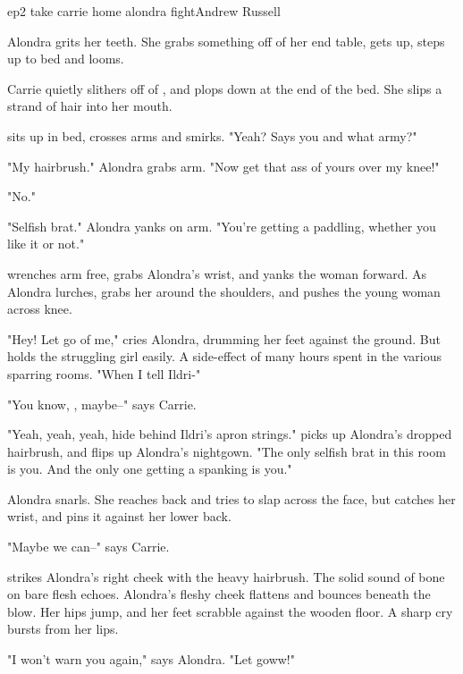 \documentclass{book}
\begin{document}
\begin{childnode}{ep2 take carrie home alondra fight}{Andrew Russell}

    Alondra grits her teeth. She grabs something off of her end table, gets up, steps up to \names{} bed and looms. 
    
    Carrie quietly slithers off of \name{}, and plops down at the end of the bed. She slips a strand of hair into her mouth.

    \name{} sits up in bed, crosses \hisher{} arms and smirks. "Yeah? Says you and what army?"

    "My hairbrush." Alondra grabs \names{} arm. "Now get that  ass of yours over my knee!"

    "No."

    "Selfish brat." Alondra yanks on \names{} arm. "You're getting a paddling, whether you like it or not."

    \name{} wrenches \hisher{} arm free, grabs Alondra's wrist, and yanks the woman forward. As Alondra lurches, \name{} grabs her around the shoulders, and pushes the young woman across \hisher{} knee. 

    "Hey! Let go of me," cries Alondra, drumming her feet against the ground. But \name{} holds the struggling girl easily. A side-effect of many hours spent in the various sparring rooms. "When I tell Ildri-"
    
    "You know, \nickname{}, maybe--" says Carrie.

    "Yeah, yeah, yeah, hide behind Ildri's apron strings." \name{} picks up Alondra's dropped hairbrush, and flips up Alondra's nightgown. "The only selfish brat in this room is you. And the only one getting a spanking is you."
    
    Alondra snarls. She reaches back and tries to slap \name{} across the face, but \name{} catches her wrist, and pins it against her lower back. 

    "Maybe we can--" says Carrie.

    \name{} strikes Alondra's right cheek with the heavy hairbrush. The solid sound of bone on bare flesh echoes. Alondra's fleshy cheek flattens and bounces beneath the blow. Her hips jump,
    and her feet scrabble against the wooden floor. A sharp cry bursts from her lips.

    "I won't warn you again," says Alondra. "Let goww!"


\end{childnode}
\end{document}
